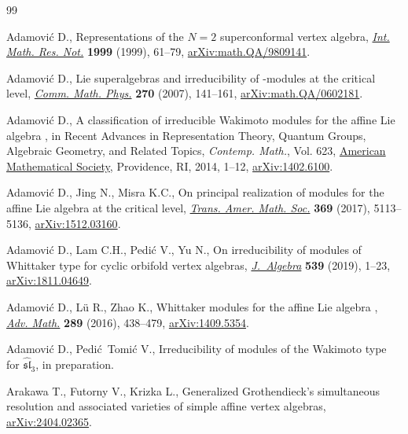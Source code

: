 \begin{thebibliography}{99}
\footnotesize\itemsep=0pt

Adamovi\'c D., Representations of the {$N=2$} superconformal vertex algebra,
 \href{https://doi.org/10.1155/S1073792899000033}{\textit{Int. Math. Res.
 Not.}} \textbf{1999} (1999), 61--79,
 \href{http://arxiv.org/abs/math.QA/9809141}{arXiv:math.QA/9809141}.

Adamovi\'c D., Lie superalgebras and irreducibility of
 -modules at the critical level,
 \href{https://doi.org/10.1007/s00220-006-0153-7}{\textit{Comm. Math. Phys.}}
 \textbf{270} (2007), 141--161,
 \href{http://arxiv.org/abs/math.QA/0602181}{arXiv:math.QA/0602181}.

Adamovi\'c D., A classification of irreducible {W}akimoto modules for the
 affine {L}ie algebra , in Recent Advances in
 Representation Theory, Quantum Groups, Algebraic Geometry, and Related
 Topics, \textit{Contemp. Math.}, Vol. 623,
 \href{https://doi.org/10.1090/conm/623/12454}{American Mathematical Society},
 Providence, RI, 2014, 1--12,
 \href{http://arxiv.org/abs/1402.6100}{arXiv:1402.6100}.

Adamovi\'c D., Jing N., Misra K.C., On principal realization of modules for the
 affine {L}ie algebra  at the critical level,
 \href{https://doi.org/10.1090/tran/7009}{\textit{Trans. Amer. Math. Soc.}}
 \textbf{369} (2017), 5113--5136,
 \href{http://arxiv.org/abs/1512.03160}{arXiv:1512.03160}.

Adamovi\'c D., Lam C.H., Pedi\'c V., Yu N., On irreducibility of modules of
 {W}hittaker type for cyclic orbifold vertex algebras,
 \href{https://doi.org/10.1016/j.jalgebra.2019.08.007}{\textit{J.~Algebra}}
 \textbf{539} (2019), 1--23,
 \href{http://arxiv.org/abs/1811.04649}{arXiv:1811.04649}.

Adamovi\'c D., L\"{u} R., Zhao K., Whittaker modules for the affine {L}ie
 algebra ,
 \href{https://doi.org/10.1016/j.aim.2015.11.020}{\textit{Adv. Math.}}
 \textbf{289} (2016), 438--479,
 \href{http://arxiv.org/abs/1409.5354}{arXiv:1409.5354}.

Adamovi\'c D., Pedi\'c~Tomi\'c V., Irreducibility of modules of the Wakimoto type for $\widehat{\mathfrak{sl}}_3$, {i}n preparation.

Arakawa T., Futorny V., Krizka L., Generalized {G}rothendieck's simultaneous
 resolution and associated varieties of simple affine vertex algebras,
 \href{http://arxiv.org/abs/2404.02365}{arXiv:2404.02365}.


\end{thebibliography}
